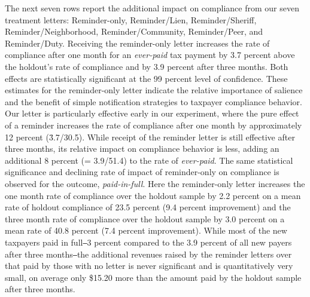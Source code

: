 \documentclass[12pt]{article}
\begin{document}
The next seven rows report the additional impact on compliance from
our seven treatment letters: Reminder-only, Reminder/Lien,
Reminder/Sheriff, Reminder/Neighborhood, Reminder/Community,
Reminder/Peer, and Reminder/Duty.  Receiving the reminder-only letter
increases the rate of compliance after one month for an
\textit{ever-paid} tax payment by 3.7 percent above the holdout's rate
of compliance and by 3.9 percent after three months.  Both effects are
statistically significant at the 99 percent level of confidence.
These estimates for the reminder-only letter indicate the relative
importance of salience and the benefit of simple notification strategies to taxpayer compliance
behavior.  Our letter is particularly effective early in our
experiment, where the pure effect of a reminder increases the rate of
compliance after one month by approximately 12 percent (\= 3.7/30.5).
While receipt of the reminder letter is still effective after three
months, its relative impact on compliance behavior is less, adding an
additional 8 percent (= 3.9/51.4) to the rate of \textit{ever-paid}.
The same statistical significance and declining rate of impact of reminder-only on
compliance is observed for the outcome, \textit{paid-in-full}.  Here
the reminder-only letter increases the one month rate of compliance
over the holdout sample by 2.2 percent on a mean rate of holdout
compliance of 23.5 percent (9.4 percent improvement) and the three
month rate of compliance over the holdout sample by 3.0 percent on a
mean rate of 40.8 percent (7.4 percent improvement). While most of the new taxpayers paid in full\texttt{--}3 percent
compared to the 3.9 percent of all new payers after three months\texttt{--}the additional revenues raised by the
reminder letters over that paid by those with no letter is never significant and is quantitatively very small,
on average only \$15.20 more than the amount paid by the holdout sample after three months.
\end{document}
